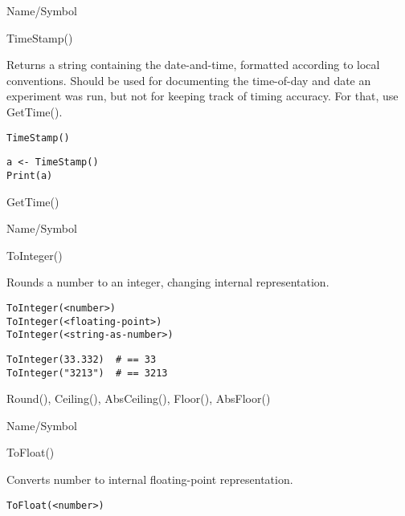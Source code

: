 \begin{desc}{Name/Symbol}
\item[Name/Symbol]  	TimeStamp()

\item[Description]  	Returns a string containing the date-and-time, formatted
	     	according to local conventions. Should be used for
	     	documenting the time-of-day and date an experiment was
	     	run, but not for keeping track of timing accuracy.  For
	     	that, use GetTime().
	     
\item[Usage]
\begin{verbatim}
TimeStamp()
\end{verbatim}

\item[Example]
\begin{verbatim}
a <- TimeStamp()
Print(a)
\end{verbatim}

\item[See Also]     	GetTime()
\end{desc}

\rl


\begin{desc}{Name/Symbol}
\item[Name/Symbol]  	ToInteger()
              
\item[Description]  	Rounds a number to an integer, changing internal 
		representation.

\item[Usage]
\begin{verbatim}
ToInteger(<number>)
ToInteger(<floating-point>)
ToInteger(<string-as-number>)
\end{verbatim}

\item[Example]
\begin{verbatim}
ToInteger(33.332)  # == 33
ToInteger("3213")  # == 3213
\end{verbatim}

\item[See Also]    	Round(), Ceiling(), AbsCeiling(), Floor(), AbsFloor()
\end{desc}

\rl


\begin{desc}{Name/Symbol}
\item[Name/Symbol]  	ToFloat()

\item[Description] 	Converts number to internal floating-point representation.

\item[Usage]
\begin{verbatim}
ToFloat(<number>)
\end{verbatim}

\item[Example]	

\item[See Also]	
\end{desc}

